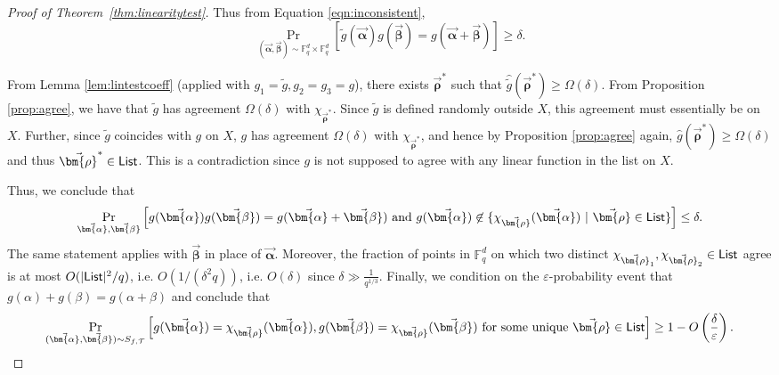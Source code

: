 \documentclass[11pt]{article}
\newcommand{\F}{\mathbb{F}}
\renewcommand{\epsilon}{\varepsilon}
\newcommand{\alphab}{\vec{\bm{\alpha}}}
\newcommand{\betab}{\vec{\bm{\beta}}}
\renewcommand{\tilde}{\widetilde}
\newcommand{\rhob}{\vec{\bm{\rho}}}
\begin{document}
\begin{proof}[Proof of Theorem~\ref{thm:linearitytest}]
Thus from Equation \eqref{eqn:inconsistent}, 
$$\Pr_{(\alphab,\betab)\sim \F_q^d\times\F_q^d}[\tilde{g}(\alphab)g(\betab)=g(\alphab+\betab)] \geq \delta.$$

From Lemma \ref{lem:lintestcoeff} (applied with $g_1 = \tilde{g}, g_2=g_3=g$), 
there exists $\rhob^*$ such that $\hat{\tilde{g}}(\rhob^*) \geq \Omega(\delta)$. From 
Proposition \ref{prop:agree}, we have that $\tilde{g}$ has agreement $\Omega(\delta)$ with $\chi_{\rhob^*}$. Since $\tilde{g}$ is defined randomly
outside $X$, this agreement must essentially be on $X$. Further, since  $\tilde{g}$ coincides with $g$ on $X$, $g$ has agreement  $\Omega(\delta)$ 
with $\chi_{\rhob^*}$, and 
hence  by Proposition \ref{prop:agree} again, 
 $\hat{g}(\rhob^*) \geq \Omega(\delta)$ and thus $\rhob^* \in {\sf List}$. This is a contradiction since
$g$ is not supposed to agree with any linear function in the list on $X$.

Thus, we conclude that  
$$\Pr_{\alphab,\betab } \left[ g(\alphab) g(\betab)= g(\alphab+\betab) \ \mbox{and} \ g(\alphab) \not\in \{ \chi_{\rhob}(\alphab) ~| ~
\rhob \in {\sf List} \}
%
\right] \leq \delta.$$
The same statement applies with $\betab$ in place of $\alphab$. Moreover, the fraction of points in $\F_q^d$ on which two distinct 
$\chi_{\rhob_1}, \chi_{\rhob_2} \in {\sf List}$ agree is at most $O(|{\sf List}|^2/q)$, i.e. $O(1/(\delta^2q))$, i.e.
$O(\delta)$ since $\delta \gg \frac{1}{q^{1/3}}$. Finally, 
we condition on the $\epsilon$-probability event that $g(\alpha)+g(\beta)=g(\alpha+\beta)$ and 
conclude that 
$$\Pr_{(\alphab,\betab) \sim S_{f, {\mathcal T} }}  
\left[  g(\alphab) = \chi_{\rhob}(\alphab), 
g(\betab) = \chi_{\rhob}(\betab) \ \mbox{for some unique} \ \rhob \in {\sf List}  
%
\right] \geq 1- O\left(\frac{\delta}{\epsilon}\right).$$
\end{proof}
\end{document}
